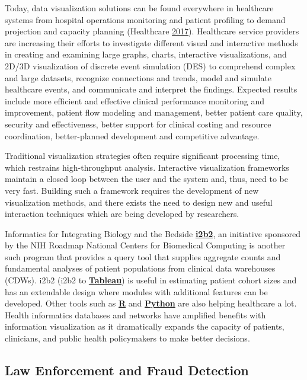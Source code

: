 \documentclass[]{book}
\begin{document}
Today, data visualization solutions can be found everywhere in healthcare systems from hospital operations monitoring and patient profiling to demand projection and capacity planning (Healthcare \protect\hyperlink{ref-marksman}{2017}). Healthcare service providers are increasing their efforts to investigate different visual and interactive methods in creating and examining large graphs, charts, interactive visualizations, and 2D/3D visualization of discrete event simulation (DES) to comprehend complex and large datasets, recognize connections and trends, model and simulate healthcare events, and communicate and interpret the findings. Expected results include more efficient and effective clinical performance monitoring and improvement, patient flow modeling and management, better patient care quality, security and effectiveness, better support for clinical costing and resource coordination, better-planned development and competitive advantage.

Traditional visualization strategies often require significant processing time, which restrains high-throughput analysis. Interactive visualization frameworks maintain a closed loop between the user and the system and, thus, need to be very fast. Building such a framework requires the development of new visualization methods, and there exists the need to design new and useful interaction techniques which are being developed by researchers.

Informatics for Integrating Biology and the Bedside \href{https://www.i2b2.org}{\textbf{i2b2}}, an initiative sponsored by the NIH Roadmap National Centers for Biomedical Computing is another such program that provides a query tool that supplies aggregate counts and fundamental analyses of patient populations from clinical data warehouses (CDWs). i2b2 (i2b2 to \href{https://www.tableau.com}{\textbf{Tableau}}) is useful in estimating patient cohort sizes and has an extendable design where modules with additional features can be developed. Other tools such as \href{https://www.r-project.org}{\textbf{R}} and \href{https://www.python.org}{\textbf{Python}} are also helping healthcare a lot. Health informatics databases and networks have amplified benefits with information visualization as it dramatically expands the capacity of patients, clinicians, and public health policymakers to make better decisions.

\hypertarget{law-enforcement-and-fraud-detection}{%
\subsection{Law Enforcement and Fraud Detection}\label{law-enforcement-and-fraud-detection}}
\end{document}
